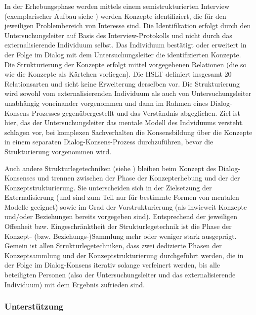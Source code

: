 In der Erhebungsphase werden mittels einem semistrukturierten Interview (exemplarischer Aufbau siehe \citep{Scheele88}) werden Konzepte identifiziert, die für den jeweiligen Problembereich von Interesse sind. Die Identifikation erfolgt durch den Untersuchungsleiter auf Basis des Interview-Protokolls und nicht durch das externalisierende Individuum selbst. Das Individuum bestätigt oder erweitert in der Folge im Dialog mit dem Untersuchungsleiter die identifizierten Konzepte. Die Strukturierung der Konzepte erfolgt mittel vorgegebenen Relationen (die so wie die Konzepte als Kärtchen vorliegen). Die \gls{HSLT} definiert insgesamt 20 Relationsarten und sieht keine Erweiterung derselben vor. Die Strukturierung wird sowohl vom externalisierenden Individuum als auch von Untersuchungsleiter unabhängig voneinander vorgenommen und dann im Rahmen eines Dialog-Konsens-Prozesses gegenübergestellt und das Verständnis abgeglichen. Ziel ist hier, das der Untersuchungsleiter das mentale Modell des Indviduums versteht. \citet{Scheele88} schlagen vor, bei komplexen Sachverhalten die Konsensbildung über die Konzepte in einem separaten Dialog-Konsens-Prozess durchzuführen, bevor die Strukturierung vorgenommen wird.

Auch andere Strukturlegetechniken (siehe \citep{Dann92}) bleiben beim Konzept des Dialog-Konsenses und trennen zwischen der Phase der Konzepterhebung und der der Konzeptstrukturierung. Sie unterscheiden sich in der Zielsetzung der Externalisierung (und sind zum Teil nur für bestimmte Formen von mentalen Modelle geeignet) sowie im Grad der Vorstrukturierung (als inwieweit Konzepte und/oder Beziehungen bereits vorgegeben sind). Entsprechend der jeweiligen Offenheit bzw. Eingeschränktheit der Strukturlegetechnik ist die Phase der Konzept- (bzw. Beziehungs-)Sammlung mehr oder weniger stark ausgeprägt. Gemein ist allen Strukturlegetechniken, dass zwei dedizierte Phasen der Konzeptsammlung und der Konzeptstrukturierung durchgeführt werden, die in der Folge im Dialog-Konsens iterativ solange verfeinert werden, bis alle beteiligten Personen (also der Untersuchungsleiter und das externalisierende Individuum) mit dem Ergebnis zufrieden sind.

\subsubsection{Unterstützung}

